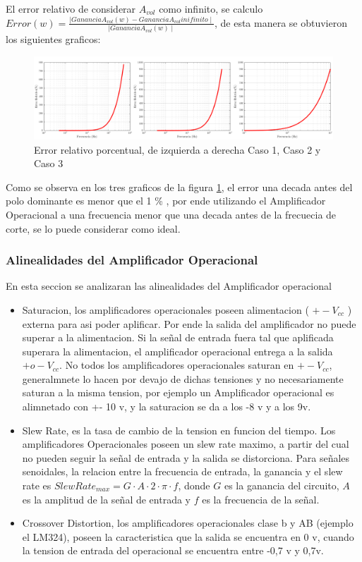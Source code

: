 \documentclass[../../main.tex]{subfiles}
\begin{document}
El error relativo de considerar $A_{vol}$  como infinito, se calculo $ Error(w) = \frac {\mid Ganancia A_{vol}(w) -Ganancia A_{vol} inifinito \mid} {\mid Ganancia A_{vol} (w) \mid }$, de esta manera se obtuvieron los siguientes graficos:

\begin{figure}[H]
\centering
\includegraphics[width=1\textwidth]{error_inv}
\caption{Error relativo porcentual, de izquierda a derecha Caso 1, Caso 2 y Caso 3} \label{fig=errorInv}
\end{figure}


Como se observa en los tres graficos de la figura \ref{fig=errorInv}, el error una decada antes del polo dominante es menor que el 1 \% , por ende utilizando el Amplificador Operacional a una frecuencia menor que una decada antes de la frecuecia de corte, se lo puede considerar como ideal.
\subsubsection{Alinealidades del Amplificador Operacional}
En esta seccion se analizaran las alinealidades del Amplificador operacional
\begin{itemize}  
\item Saturacion, los amplificadores operacionales poseen alimentacion ( $+-V_{cc}$ ) externa para asi poder aplificar. Por ende la salida del amplificador no puede superar a la alimentacion. Si la señal de entrada fuera tal que aplificada superara la alimentacion, el amplificador operacional entrega a la salida $+ o -V_{cc}$. No todos los amplificadores operacionales saturan en $+-V_{cc}$, generalmnete lo hacen por devajo de dichas tensiones y no necesariamente saturan a la misma tension, por ejemplo un Amplificador operacional es alimnetado con +- 10 v, y la saturacion se da a los -8 v y a los 9v. 
\item Slew Rate, es la tasa de cambio de la tension en funcion del tiempo. Los amplificadores Operacionales poseen un slew rate maximo, a partir del cual no pueden seguir la señal de entrada y la salida se distorciona. Para señales senoidales, la relacion entre la frecuencia de entrada, la ganancia y el slew rate es $ SlewRate_{max}=G  \cdot A \cdot 2 \cdot \pi \cdot f $, donde $ G $ es la ganancia del circuito, $ A $ es la amplitud de la señal de entrada y $f$ es la frecuencia de la señal.  
\item Crossover Distortion, los amplificadores operacionales clase b y AB (ejemplo el LM324), poseen la caracteristica que la salida se encuentra en 0 v, cuando la tension de entrada del operacional se encuentra entre -0,7 v y 0,7v.
\end{itemize}
\end{document}
